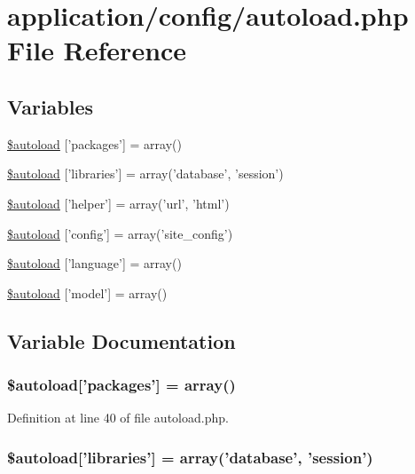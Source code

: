 \hypertarget{autoload_8php}{\section{application/config/autoload.php File Reference}
\label{autoload_8php}
}
\subsection*{Variables}
\begin{DoxyCompactItemize}
\item 
\hyperlink{autoload_8php_ab562c5bbb18f14d6b6b7014d9166625d}{\$autoload} \mbox{[}'packages'\mbox{]} = array()
\item 
\hyperlink{autoload_8php_ab86d0a1a62e12b528eacaa7100bc4d93}{\$autoload} \mbox{[}'libraries'\mbox{]} = array('database', 'session')
\item 
\hyperlink{autoload_8php_aa98014ce8ad854ad9500e65ff159272d}{\$autoload} \mbox{[}'helper'\mbox{]} = array('url', 'html')
\item 
\hyperlink{autoload_8php_ac051887e192979c0320e05821bad8f33}{\$autoload} \mbox{[}'config'\mbox{]} = array('site\-\_\-config')
\item 
\hyperlink{autoload_8php_addfee4f4b38a8235172cb173995a9c0b}{\$autoload} \mbox{[}'language'\mbox{]} = array()
\item 
\hyperlink{autoload_8php_a942b884082b1defda7fb10ee71bba324}{\$autoload} \mbox{[}'model'\mbox{]} = array()
\end{DoxyCompactItemize}


\subsection{Variable Documentation}
\hypertarget{autoload_8php_ab562c5bbb18f14d6b6b7014d9166625d}{
\subsubsection[{\$autoload}]{\setlength{\rightskip}{0pt plus 5cm}\$autoload\mbox{[}'packages'\mbox{]} = array()}}\label{autoload_8php_ab562c5bbb18f14d6b6b7014d9166625d}


Definition at line 40 of file autoload.\-php.

\hypertarget{autoload_8php_ab86d0a1a62e12b528eacaa7100bc4d93}{
\subsubsection[{\$autoload}]{\setlength{\rightskip}{0pt plus 5cm}\$autoload\mbox{[}'libraries'\mbox{]} = array('database', 'session')}}\label{autoload_8php_ab86d0a1a62e12b528eacaa7100bc4d93}


